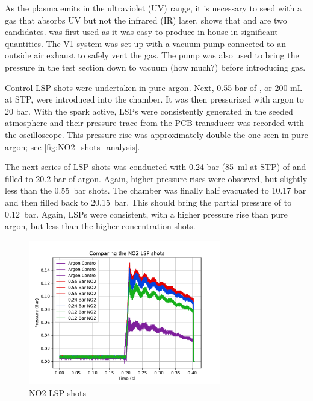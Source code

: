             As the plasma emits in the ultraviolet (UV) range, it is necessary to seed with a gas that absorbs UV but not the infrared (IR) laser. \textcite{khanGasDetectionUsing2019} shows that  and  are two candidates.  was first used as it was easy to produce in-house in significant quantities. The V1 system was set up with a vacuum pump connected to an outside air exhaust to safely vent the  gas. The pump was also used to bring the pressure in the test section down to vacuum (how much?) before introducing gas.

            Control LSP shots were undertaken in pure argon. Next, 0.55 bar of , or 200 mL at STP, were introduced into the chamber. It was then pressurized with argon to 20 bar. With the spark active, LSPs were consistently generated in the seeded atmosphere and their pressure trace from the PCB transducer was recorded with the oscilloscope. This pressure rise was approximately double the one seen in pure argon; see \autoref{fig:NO2_shots_analysis}.

            The next series of LSP shots was conducted with 0.24 bar (\qty{85}{ml} at STP) of  and filled to 20.2 bar of argon. Again, higher pressure rises were observed, but slightly less than the \qty{0.55}{bar} shots. The chamber was finally half evacuated to 10.17 bar and then filled back to \qty{20.15}{bar}. This should bring the partial pressure of  to \qty{0.12}{bar}. Again, LSPs were consistent, with a higher pressure rise than pure argon, but less than the higher concentration  shots.

            \begin{figure}[h]
                \centering
                \includegraphics[width=0.75\textwidth]{assets/5 results/NO2_shots_analysis.pdf}
                \caption{NO2 LSP shots}
                \label{fig:NO2_shots_analysis}
            \end{figure}

